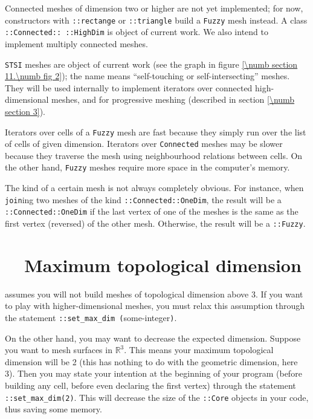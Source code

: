 Connected meshes of dimension two or higher are not yet implemented; for now,
{\small\tt {}} constructors with {\small\tt {}::rectange} or
{\small\tt {}::triangle} build a {\small\tt Fuzzy} mesh instead.
A class {\small\tt {}::Connected:: ::HighDim} is object of current work.
We also intend to implement multiply connected meshes.

{\small\tt STSI} meshes are object of current work (see the graph in figure
\ref{\numb section 11.\numb fig 2}); the name means ``self-touching or self-intersecting'' meshes.
They will be used internally to implement iterators over connected high-dimensional meshes,
and for progressive meshing (described in section \ref{\numb section 3}).

Iterators over cells of a {\small\tt Fuzzy} mesh are fast because they simply run over the
list of cells of given dimension.
Iterators over {\small\tt Connected} meshes may be slower because they traverse the mesh using
neighbourhood relations between cells.
On the other hand, {\small\tt Fuzzy} meshes require more space in the computer's memory.

The kind of a certain mesh is not always completely obvious.
For instance, when {\small\tt join}ing two meshes of the kind
{\small\tt {}::Connected::OneDim}, the result will be a
{\small\tt {}::Connected::OneDim} if the last vertex of one of the meshes
is the same as the first vertex (reversed) of the other mesh.
Otherwise, the result will be a {\small\tt {}::Fuzzy}.


\section{~~Maximum topological dimension}\label{\numb section 11.\numb parag 7}

\leavevmode {\ManiFEM} assumes you will not build meshes of topological dimension
above 3.
If you want to play with higher-dimensional meshes, you must relax this assumption
through the statement {\small\tt {}::set\_max\_dim (}some-integer{\small\tt )}.

On the other hand, you may want to decrease the expected dimension.
Suppose you want to mesh surfaces in $ \mathbb{R}^3 $.
This means your maximum topological dimension will be 2
(this has nothing to do with the geometric dimension, here 3).
Then you may state your intention at the beginning of your program
(before building any cell, before even declaring the first vertex) through
the statement {\small\tt {}::set\_max\_dim(2)}.
This will decrease the size of the {\small\tt {}::Core} objects in your code,
thus saving some memory.


